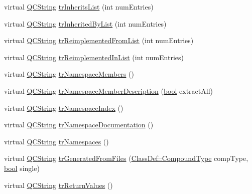 \begin{DoxyCompactItemize}
\item 
virtual \hyperlink{class_q_c_string}{Q\+C\+String} \hyperlink{class_translator_serbian_cyrillic_ab9c7c32c3505482a0bf58bb69dede806}{tr\+Inherits\+List} (int num\+Entries)
\item 
virtual \hyperlink{class_q_c_string}{Q\+C\+String} \hyperlink{class_translator_serbian_cyrillic_aedcfd05bfcadc55ac5ed9e78320ec3ca}{tr\+Inherited\+By\+List} (int num\+Entries)
\item 
virtual \hyperlink{class_q_c_string}{Q\+C\+String} \hyperlink{class_translator_serbian_cyrillic_a3b5b178ee91fdb6453c37adf68b8f329}{tr\+Reimplemented\+From\+List} (int num\+Entries)
\item 
virtual \hyperlink{class_q_c_string}{Q\+C\+String} \hyperlink{class_translator_serbian_cyrillic_aa81e6f588e7cdf62347c04b0979aa889}{tr\+Reimplemented\+In\+List} (int num\+Entries)
\item 
virtual \hyperlink{class_q_c_string}{Q\+C\+String} \hyperlink{class_translator_serbian_cyrillic_aed41f07384469cb088f6c89ccb5822c5}{tr\+Namespace\+Members} ()
\item 
virtual \hyperlink{class_q_c_string}{Q\+C\+String} \hyperlink{class_translator_serbian_cyrillic_ae8413d6ec3c8802e09cd14bf254a2f3a}{tr\+Namespace\+Member\+Description} (\hyperlink{qglobal_8h_a1062901a7428fdd9c7f180f5e01ea056}{bool} extract\+All)
\item 
virtual \hyperlink{class_q_c_string}{Q\+C\+String} \hyperlink{class_translator_serbian_cyrillic_a9369007351adee7d2b0b4e489c2e192c}{tr\+Namespace\+Index} ()
\item 
virtual \hyperlink{class_q_c_string}{Q\+C\+String} \hyperlink{class_translator_serbian_cyrillic_a63a41233fd8d4e57d2b4342321daca09}{tr\+Namespace\+Documentation} ()
\item 
virtual \hyperlink{class_q_c_string}{Q\+C\+String} \hyperlink{class_translator_serbian_cyrillic_ac403f97448f90c24fdd0368f356c58a8}{tr\+Namespaces} ()
\item 
virtual \hyperlink{class_q_c_string}{Q\+C\+String} \hyperlink{class_translator_serbian_cyrillic_a2f4c3c830e8c6b1e025b5a968bfa505c}{tr\+Generated\+From\+Files} (\hyperlink{class_class_def_ae70cf86d35fe954a94c566fbcfc87939}{Class\+Def\+::\+Compound\+Type} comp\+Type, \hyperlink{qglobal_8h_a1062901a7428fdd9c7f180f5e01ea056}{bool} single)
\item 
virtual \hyperlink{class_q_c_string}{Q\+C\+String} \hyperlink{class_translator_serbian_cyrillic_a8a9b220f27ae1c967f43ff8716eeff03}{tr\+Return\+Values} ()
\item 

\end{DoxyCompactItemize}
